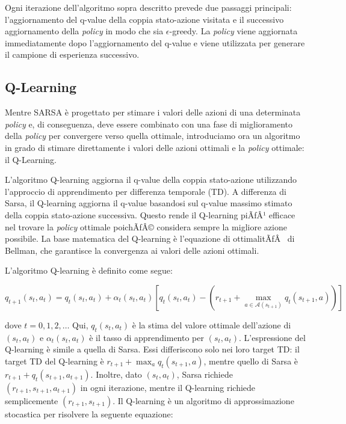 ﻿\documentclass[11pt, a4paper]{report}
\begin{document}
Ogni iterazione dell'algoritmo sopra descritto prevede due passaggi principali: l'aggiornamento del q-value della coppia stato-azione visitata e il successivo aggiornamento della \emph{policy} in modo che sia $\epsilon$-greedy. La \emph{policy} viene aggiornata immediatamente dopo l'aggiornamento del q-value e viene utilizzata per generare il campione di esperienza successivo.

\newpage

\subsection{Q-Learning}

Mentre SARSA è progettato per stimare i valori delle azioni di una determinata \emph{policy} e, di conseguenza, deve essere combinato con una fase di miglioramento della \emph{policy} per convergere verso quella ottimale, introduciamo ora un algoritmo in grado di stimare direttamente i valori delle azioni ottimali e la \emph{policy} ottimale: il Q-Learning.

L'algoritmo Q-learning aggiorna il q-value della coppia stato-azione utilizzando l'approccio di apprendimento per differenza temporale (TD). A differenza di Sarsa, il Q-learning aggiorna il q-value basandosi sul q-value massimo stimato della coppia stato-azione successiva. Questo rende il Q-learning piÃƒÂ¹ efficace nel trovare la \emph{policy} ottimale poichÃƒÂ© considera sempre la migliore azione possibile. La base matematica del Q-learning è l'equazione di ottimalitÃƒÂ  di Bellman, che garantisce la convergenza ai valori delle azioni ottimali.

L'algoritmo Q-learning è definito come segue:

\[
q_{t+1}(s_t, a_t) = q_t(s_t, a_t) + \alpha_t(s_t, a_t)[q_t(s_t, a_t) - (r_{t+1} + \max_{a \in \mathcal{A}(s_{t+1})} q_t(s_{t+1}, a))] \tag{5.10}
\]

dove $t = 0, 1, 2, \dots$ Qui, $q_t(s_t, a_t)$ è la stima del valore ottimale dell'azione di $(s_t, a_t)$ e $\alpha_t(s_t, a_t)$ è il tasso di apprendimento per $(s_t, a_t)$. L'espressione del Q-learning è simile a quella di Sarsa. Essi differiscono solo nei loro target TD: il target TD del Q-learning è $r_{t+1} + \max_a q_t(s_{t+1}, a)$, mentre quello di Sarsa è $r_{t+1} + q_t(s_{t+1}, a_{t+1})$. Inoltre, dato $(s_t, a_t)$, Sarsa richiede $(r_{t+1}, s_{t+1}, a_{t+1})$ in ogni iterazione, mentre il Q-learning richiede semplicemente $(r_{t+1}, s_{t+1})$. Il Q-learning è un algoritmo di approssimazione stocastica per risolvere la seguente equazione:
\end{document}
